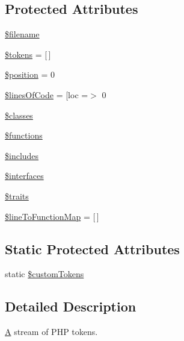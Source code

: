\subsection*{Protected Attributes}
\begin{DoxyCompactItemize}
\item 
\mbox{\hyperlink{class_p_h_p___token___stream_a0722441477f957078ee2437054556cbc}{\$filename}}
\item 
\mbox{\hyperlink{class_p_h_p___token___stream_a72ead29e4317fbc4335fd3ba764e8b59}{\$tokens}} = \mbox{[}$\,$\mbox{]}
\item 
\mbox{\hyperlink{class_p_h_p___token___stream_a6e88dcb746884d18f6c89eb9b9c14a42}{\$position}} = 0
\item 
\mbox{\hyperlink{class_p_h_p___token___stream_adb8c8ddd083f5b008473acf309ba9c5a}{\$lines\+Of\+Code}} = \mbox{[}\textquotesingle{}loc\textquotesingle{} =$>$ 0
\item 
\mbox{\hyperlink{class_p_h_p___token___stream_a4212f1eca3e4faf764728d56bc13dfd3}{\$classes}}
\item 
\mbox{\hyperlink{class_p_h_p___token___stream_aa75daea491817f3b64daa2f51128bcdf}{\$functions}}
\item 
\mbox{\hyperlink{class_p_h_p___token___stream_a32d017dad1664a5d9e0392a04d7f543c}{\$includes}}
\item 
\mbox{\hyperlink{class_p_h_p___token___stream_a995aac803a8860a27f5eda9af6c4870a}{\$interfaces}}
\item 
\mbox{\hyperlink{class_p_h_p___token___stream_a00d691d7d5290df7d075c00deb62dd1b}{\$traits}}
\item 
\mbox{\hyperlink{class_p_h_p___token___stream_a76468ef5c80d86d9a624d23e0c5c3912}{\$line\+To\+Function\+Map}} = \mbox{[}$\,$\mbox{]}
\end{DoxyCompactItemize}
\subsection*{Static Protected Attributes}
\begin{DoxyCompactItemize}
\item 
static \mbox{\hyperlink{class_p_h_p___token___stream_a3e2658c2033c52808af352861b6eec4d}{\$custom\+Tokens}}
\end{DoxyCompactItemize}


\subsection{Detailed Description}
\mbox{\hyperlink{class_a}{A}} stream of P\+HP tokens. 

